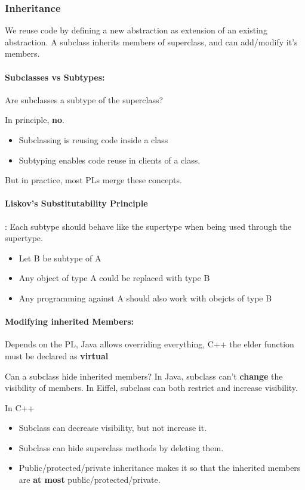\documentclass{article}
\begin{document}
\subsubsection{Inheritance}
We reuse code by defining a new abstraction as extension of an existing abstraction. A subclass inherits members of superclass, and can add/modify it's members.

\paragraph{Subclasses vs Subtypes: }Are subclasses a subtype of the superclass? 

In principle, \textbf{no}.
\begin{itemize}
  \item Subclassing is reusing code inside a class
  \item Subtyping enables code reuse in clients of a class.
\end{itemize}
But in practice, most PLs merge these concepts.

\paragraph{Liskov's Substitutability Principle}: Each subtype should behave like the supertype when being used through the supertype.

\begin{itemize}
  \item Let B be subtype of A
  \item Any object of type A could be replaced with type B
  \item Any programming against A should also work with obejcts of type B
\end{itemize}

\paragraph{Modifying inherited Members: } Depends on the PL, Java allows overriding everything, C++ the elder function must be declared as \textbf{virtual}

Can a subclass hide inherited members? In Java, subclass can't \textbf{change} the visibility of members. In Eiffel, subclass can both restrict and increase visibility. 

In C++
\begin{itemize}
  \item Subclass can decrease visibility, but not increase it.
  \item Subclass can hide superclass methods by deleting them.
  \item Public/protected/private inheritance makes it so that the inherited members are \textbf{at most} public/protected/private.
\end{itemize}
\end{document}
